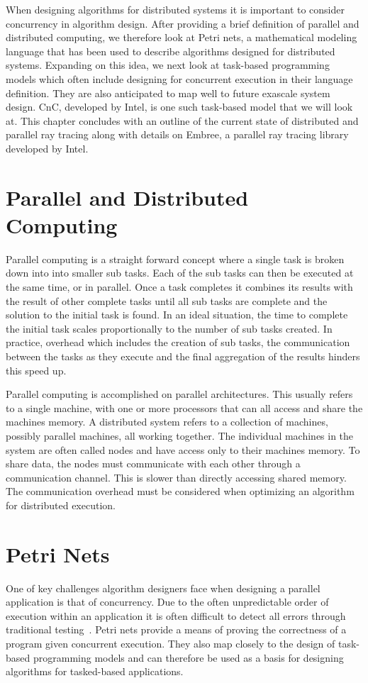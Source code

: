 When designing algorithms for distributed systems it is important to consider 
concurrency in algorithm design.  After providing a brief definition of parallel
and distributed computing, we therefore look at Petri nets, a mathematical 
modeling language that has been used to describe algorithms designed for 
distributed systems.  Expanding on this idea, we next look at task-based 
programming models which often include designing for concurrent execution in
their language definition.  They are also anticipated to map well to future 
exascale system design.  CnC, developed by Intel, is one such task-based model 
that we will look at.  This chapter concludes with an outline of the current 
state of distributed and parallel ray tracing along with details on Embree, a
parallel ray tracing library developed by Intel.

\section{Parallel and Distributed Computing}
\label{sec:computing}

Parallel computing is a straight forward concept where a single task is broken 
down into into smaller sub tasks.  Each of the sub tasks can then be executed at
the same time, or in parallel.  Once a task completes it combines its results 
with the result of other complete tasks until all sub tasks are complete and the
solution to the initial task is found.  In an ideal situation, the time to 
complete the initial task scales proportionally to the number of sub tasks 
created.  In practice, overhead which includes the creation of sub tasks, 
the communication between the tasks as they execute and the final aggregation of 
the results hinders this speed up.

Parallel computing is accomplished on parallel architectures.  This usually 
refers to a single machine, with one or more processors that can all access and
share the machines memory.  A distributed system refers to a collection of
machines, possibly parallel machines, all working together.  The individual 
machines in the system are often called nodes and have access only to their 
machines memory.  To share data, the nodes must communicate with each other
through a communication channel. This is slower than directly accessing shared
memory.  The communication overhead must be considered when optimizing an 
algorithm for distributed execution.

\section{Petri Nets}
\label{sec:petri-nets}
One of key challenges algorithm designers face when designing a parallel 
application is that of concurrency.  Due to the often unpredictable order of
execution within an application it is often difficult to detect all errors 
through traditional testing~\cite{franco2012true}.  Petri nets provide a means 
of proving the correctness of a program given concurrent execution.  They also 
map closely to the design of task-based programming models and can therefore be 
used as a basis for designing algorithms for tasked-based applications.

